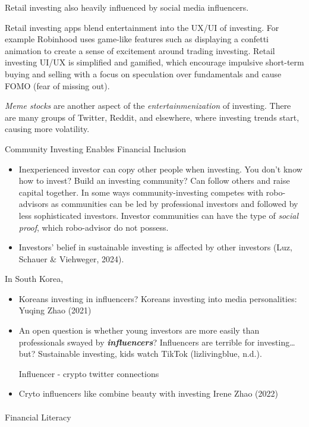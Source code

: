\documentclass[
  letterpaper,
  DIV=11,
  numbers=noendperiod]{scrartcl}
\makeatletter
\let\oldparagraph\paragraph
\renewcommand{\paragraph}{
    \@ifstar
      \xxxParagraphStar
      \xxxParagraphNoStar
  }
\newcommand{\xxxParagraphStar}[1]{\oldparagraph*{#1}\mbox{}}
\newcommand{\xxxParagraphNoStar}[1]{\oldparagraph{#1}\mbox{}}
\providecommand{\tightlist}{%
  \setlength{\itemsep}{0pt}\setlength{\parskip}{0pt}}\usepackage{longtable,booktabs,array}
\makeatother
\begin{document}
Retail investing also heavily influenced by social media influencers.

Retail investing apps blend entertainment into the UX/UI of investing.
For example Robinhood uses game-like features such as displaying a
confetti animation to create a sense of excitement around trading
investing. Retail investing UI/UX is simplified and gamified, which
encourage impulsive short-term buying and selling with a focus on
speculation over fundamentals and cause FOMO (fear of missing out).

\emph{Meme stocks} are another aspect of the \emph{entertainmenization}
of investing. There are many groups of Twitter, Reddit, and elsewhere,
where investing trends start, causing more volatility.

Community Investing Enables Financial Inclusion

\begin{itemize}
\tightlist
\item
  Inexperienced investor can copy other people when investing. You don't
  know how to invest? Build an investing community? Can follow others
  and raise capital together. In some ways community-investing competes
  with robo-advisors as communities can be led by professional investors
  and followed by less sophisticated investors. Investor communities can
  have the type of \emph{social proof}, which robo-advisor do not
  possess.
\item
  Investors' belief in sustainable investing is affected by other
  investors (Luz, Schauer \& Viehweger, 2024).
\end{itemize}

In South Korea,

\begin{itemize}
\item
  Koreans investing in influencers? Koreans investing into media
  personalities: Yuqing Zhao (2021)
\item
  An open question is whether young investors are more easily than
  professionals swayed by \textbf{\emph{influencers}}? Influencers are
  terrible for investing\ldots{} but? Sustainable investing, kids watch
  TikTok (lizlivingblue, n.d.).

  Influencer - crypto twitter connections
\item
  Cryto influencers like combine beauty with investing Irene Zhao (2022)
\end{itemize}

\paragraph{Financial Literacy}\label{financial-literacy}
\end{document}

